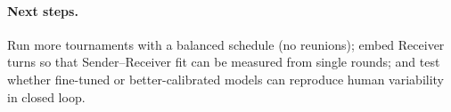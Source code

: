 \documentclass[11pt]{article}
\begin{document}
\paragraph{Next steps.} Run more tournaments with a balanced schedule (no reunions); embed Receiver turns so that Sender--Receiver fit can be measured from single rounds; and test whether fine-tuned or better-calibrated models can reproduce human variability in closed loop.



\end{document}
